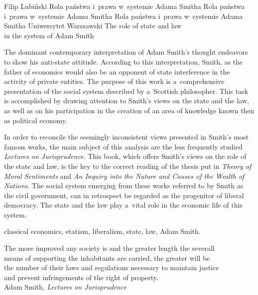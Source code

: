 \begin{artplenv}{Filip Lubiński}
	{Rola państwa i~prawa w~systemie Adama Smitha}
	{Rola państwa i~prawa w~systemie Adama Smitha}
	{Rola państwa i~prawa w~systemie Adama Smitha}
	{Uniwersytet Warszawski\label{lub-start}}
	{The role of state and law\\in the system of Adam Smith}
	{The dominant contemporary interpretation of Adam Smith's thought endeavors to show his anti-state attitude.
		According to this interpretation, Smith, as the father of economics would also be an opponent of state interference in
		the activity of private entities. The purpose of this work is a~comprehensive presentation of the social system
		described by a~Scottish philosopher. This task is accomplished by drawing attention to Smith's views on the state and
		the law, as well as on his participation in the creation of an area of knowledge known then as political economy.
		
		In order to reconcile the seemingly inconsistent views presented in Smith's most famous works, the main subject of
		this analysis are the less frequently studied \textit{Lectures on Jurisprudence}. This book, which offers Smith's views
		on the role of the state and law, is the key to the correct reading of the thesis put in \textit{Theory of Moral
			Sentiments} and \textit{An Inquiry into the Nature and Causes of the Wealth of Nations}. The social system emerging
		from these works referred to by Smith as the civil government, can in retrospect be regarded as the progenitor of
		liberal democracy. The state and the law play a~vital role in the economic life of this system.}
	{classical economics, etatism, liberalism, state, law, Adam Smith.}
	

\begin{footnotesize}
\begin{flushright}
	The more improved any society is and the greater length the severall\\
	means of supporting the inhabitants are carried, the greater will be\\
	the number of their laws and regulations necessary to maintain justice\\
	and prevent infringements of the right of property.\\
	Adam Smith, \textit{Lectures on Jurisprudence}
	
\end{flushright}	
\end{footnotesize}





\end{artplenv}
